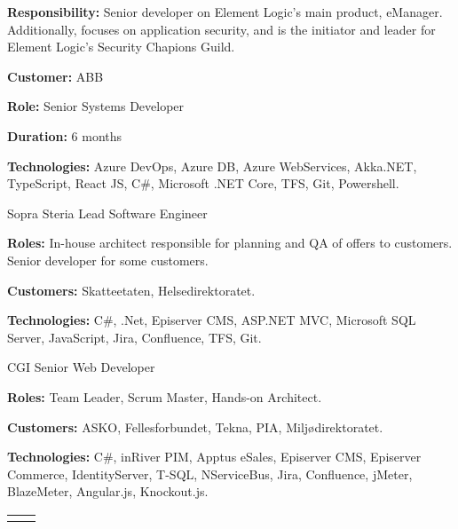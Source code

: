 \documentclass[10pt]{article} %
\begin{document}
\begin{paracol}{2}
{\textbf{Responsibility:} Senior developer on Element Logic's main product, eManager. Additionally,  focuses on application security, and is the initiator and leader for Element Logic's Security Chapions Guild.
 
\textbf{}
 
\textbf{Customer:} ABB

\textbf{Role:} Senior Systems Developer

\textbf{Duration:} 6 months

\textbf{Technologies:} Azure DevOps, Azure DB, Azure WebServices, Akka.NET, TypeScript, React JS, C\#, Microsoft .NET Core, TFS, Git, Powershell.
} 

{}
{Sopra Steria} 
{Lead Software Engineer} 
{\textbf{Roles:} In-house architect responsible for planning and QA of offers to customers. Senior developer for some customers.

\textbf{Customers:} Skatteetaten, Helsedirektoratet.

\textbf{Technologies:} C\#, .Net, Episerver CMS, ASP.NET MVC, Microsoft SQL Server, JavaScript, Jira, Confluence, TFS, Git.
} 

{}
{CGI} 
{Senior Web Developer} 
{\textbf{Roles:} Team Leader, Scrum Master, Hands-on Architect.

\textbf{Customers:} ASKO, Fellesforbundet, Tekna, PIA, Miljødirektoratet.

\textbf{Technologies:} C\#, inRiver PIM, Apptus eSales, Episerver CMS, Episerver Commerce, IdentityServer, T-SQL, NServiceBus, Jira, Confluence, jMeter, BlazeMeter, Angular.js, Knockout.js.
} 
 

\begin{supertabular}{rl} %

\end{supertabular}

\vspace{-\baselineskip}\medskip %
\switchcolumn %


\end{paracol}
\end{document}
